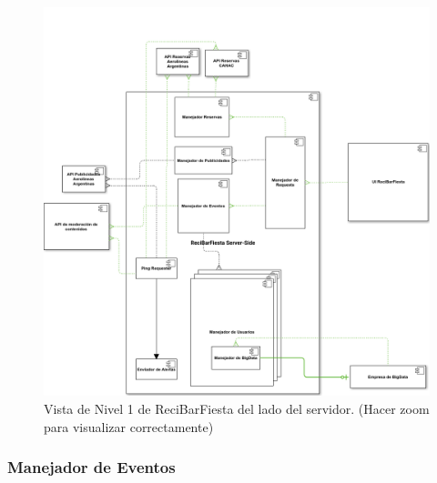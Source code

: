 \begin{figure}[H]
  \centering
  \includegraphics[width=\textwidth]{diagramas/ReciBarFiesta.png}
  \caption{\normalfont Vista de Nivel 1 de ReciBarFiesta del lado del servidor. (Hacer zoom para visualizar correctamente)}
\end{figure}

\subsubsection{Manejador de Eventos}

